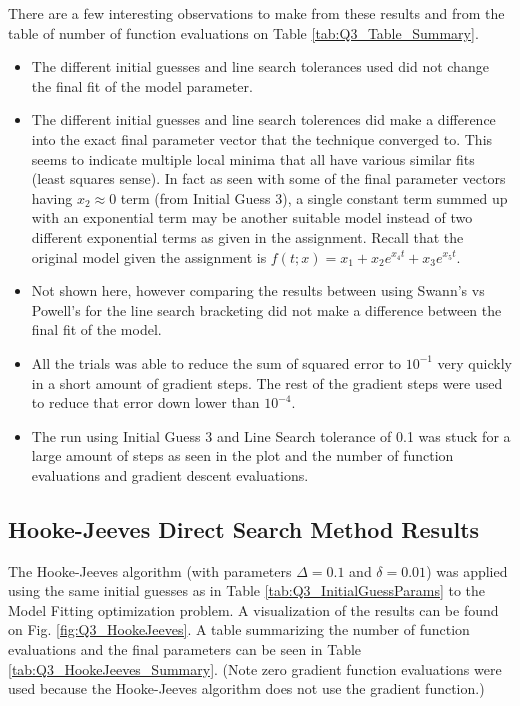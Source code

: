 \documentclass{article}
\begin{document}
    There are a few interesting observations to make from these results and from the table of number of function evaluations on Table \ref{tab:Q3_Table_Summary}.
    \begin{itemize}
        \item The different initial guesses and line search tolerances used did not change the final fit of the model parameter. 
        \item The different initial guesses and line search tolerences did make a difference into the exact final parameter vector that the technique converged to. This seems to indicate multiple local minima that all have various similar fits (least squares sense). In fact as seen with some of the final parameter vectors having $x_2 \approx 0$ term (from Initial Guess 3), a single constant term summed up with an exponential term may be another suitable model instead of two different exponential terms as given in the assignment. Recall that the original model given the assignment is $f(t; x) = x_1 + x_2 e^{x_4 t} +x_3 e^ {x_5 t}$.
        \item Not shown here, however comparing the results between using Swann's vs Powell's for the line search bracketing did not make a difference between the final fit of the model.
        \item All the trials was able to reduce the sum of squared error to $10^{-1}$ very quickly in a short amount of gradient steps. The rest of the gradient steps were used to reduce that error down lower than $10^{-4}$.
        \item The run using Initial Guess 3 and Line Search tolerance of 0.1 was stuck for a large amount of steps as seen in the plot and the number of function evaluations and gradient descent evaluations.
    \end{itemize}
    
    \subsection{Hooke-Jeeves Direct Search Method Results}

    The Hooke-Jeeves algorithm (with parameters $\Delta = 0.1$ and $\delta = 0.01$) was applied using the same initial guesses as in Table \ref{tab:Q3_InitialGuessParams} to the Model Fitting optimization problem. 
    A visualization of the results can be found on Fig. \ref{fig:Q3_HookeJeeves}. A table summarizing the number of function evaluations and the final parameters can be seen in Table \ref{tab:Q3_HookeJeeves_Summary}. (Note zero gradient function evaluations were used because the Hooke-Jeeves algorithm does not use the gradient function.)
\end{document}
